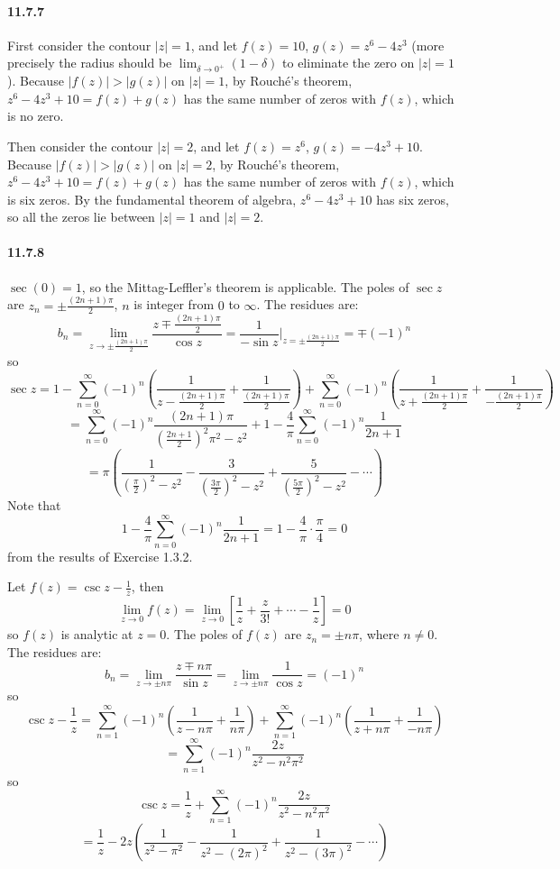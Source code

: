 \documentclass[a4paper]{article}
\begin{document}
\paragraph{11.7.7}
First consider the contour $|z|=1$, and let $f(z)=10$, $g(z)=z^6-4z^3$ (more precisely the radius should be $\lim_{\delta\to0^+}(1-\delta)$ to eliminate the zero on $|z|=1$). Because $|f(z)|>|g(z)|$ on $|z|=1$, by Rouché’s theorem, $z^6-4z^3+10=f(z)+g(z)$ has the same number of zeros with $f(z)$, which is no zero.

Then consider the contour $|z|=2$, and let $f(z)=z^6$, $g(z)=-4z^3+10$. Because $|f(z)|>|g(z)|$ on $|z|=2$, by Rouché’s theorem, $z^6-4z^3+10=f(z)+g(z)$ has the same number of zeros with $f(z)$, which is six zeros. By the fundamental theorem of algebra, $z^6-4z^3+10$ has six zeros, so all the zeros lie between $|z|=1$ and $|z|=2$.

\paragraph{11.7.8}
$\sec(0)=1$, so the Mittag-Leffler’s theorem is applicable. The poles of $\sec z$ are $z_n=\pm\frac{(2n+1)\pi}{2}$, $n$ is integer from $0$ to $\infty$. The residues are:
\[
b_n=\lim_{z\to\pm\frac{(2n+1)\pi}{2}}\frac{z\mp\frac{(2n+1)\pi}{2}}{\cos z}=\frac{1}{-\sin z}\Big|_{z=\pm\frac{(2n+1)\pi}{2}}=\mp(-1)^n
\]
so
\[
\sec z=1-\sum_{n=0}^\infty(-1)^n\left(\frac{1}{z-\frac{(2n+1)\pi}{2}}+\frac{1}{\frac{(2n+1)\pi}{2}} \right)+\sum_{n=0}^\infty(-1)^n\left(\frac{1}{z+\frac{(2n+1)\pi}{2}}+\frac{1}{-\frac{(2n+1)\pi}{2}} \right)
\]
\[
=\sum_{n=0}^\infty(-1)^n\frac{(2n+1)\pi}{\left(\frac{2n+1}{2}\right)^2\pi^2-z^2}+1-\frac{4}{\pi}\sum_{n=0}^\infty(-1)^n\frac{1}{2n+1}
\]
\[
=\pi\left(\frac{1}{(\frac{\pi}{2})^2-z^2}-\frac{3}{(\frac{3\pi}{2})^2-z^2}+\frac{5}{(\frac{5\pi}{2})^2-z^2}-\cdots \right)
\]
Note that 
\[
1-\frac{4}{\pi}\sum_{n=0}^\infty(-1)^n\frac{1}{2n+1}=1-\frac{4}{\pi}\cdot\frac{\pi}{4}=0
\]
from the results of Exercise 1.3.2.
\medskip

Let $f(z)=\csc z-\frac{1}{z}$, then
\[
\lim_{z\to0}f(z)=\lim_{z\to0}\left[\frac{1}{z}+\frac{z}{3!}+\cdots-\frac{1}{z} \right]=0
\]
so $f(z)$ is analytic at $z=0$. The poles of $f(z)$ are $z_n=\pm n\pi$, where $n\neq0$. The residues are:
\[
b_n=\lim_{z\to\pm n\pi}\frac{z\mp n\pi}{\sin z}=\lim_{z\to\pm n\pi}\frac{1}{\cos z}=(-1)^n
\]
so
\[
\csc z-\frac{1}{z}=\sum_{n=1}^\infty(-1)^n\left(\frac{1}{z-n\pi}+\frac{1}{n\pi} \right)+\sum_{n=1}^\infty(-1)^n\left(\frac{1}{z+n\pi}+\frac{1}{-n\pi} \right)
\]
\[
=\sum_{n=1}^\infty(-1)^n\frac{2z}{z^2-n^2\pi^2}
\]
so
\[
\csc z=\frac{1}{z}+\sum_{n=1}^\infty(-1)^n\frac{2z}{z^2-n^2\pi^2}
\]
\[
=\frac{1}{z}-2z\left(\frac{1}{z^2-\pi^2}-\frac{1}{z^2-(2\pi)^2}+\frac{1}{z^2-(3\pi)^2}-\cdots \right)
\]
\end{document}
